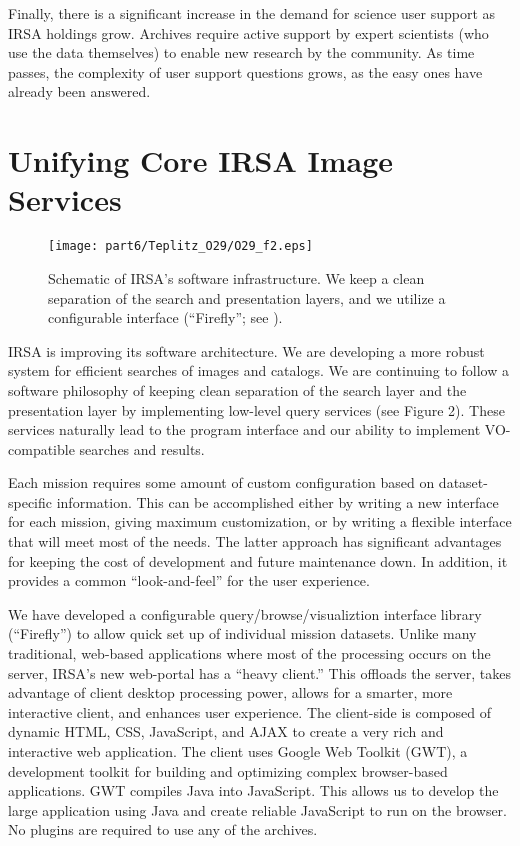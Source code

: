 Finally, there is a significant increase in the demand for
science user support as IRSA holdings grow.  Archives require active
support by expert scientists (who use the data themselves) to enable
new research by the community.  As time passes, the complexity of user
support questions grows, as the easy ones have already been answered.


\section{Unifying Core IRSA Image Services}

\begin{figure}[t]

\centering
\texttt{[image: part6/Teplitz\_O29/O29\_f2.eps]}
\caption{Schematic of IRSA's software infrastructure. We keep a clean 
separation of the search and presentation layers, and we utilize a
configurable interface (``Firefly''; see \citet{roby_XXII}).}

\end{figure}

IRSA is improving its software architecture. We are developing a more
robust system for efficient searches of images and catalogs. We are
continuing to follow a software philosophy of keeping clean separation
of the search layer and the presentation layer by implementing
low-level query services (see Figure 2). These services naturally lead to the program
interface and our ability to implement VO-compatible
searches and results.

Each mission requires some amount of custom configuration
based on dataset-specific information.  This can be accomplished
either by writing a new interface for each mission, giving maximum
customization, or by writing a flexible interface that will meet most
of the needs.  The latter approach has significant advantages for
keeping the cost of development and future maintenance down.  In
addition, it provides a common ``look-and-feel'' for the user experience.

We have developed a configurable query/browse/visualiztion interface
library (``Firefly'') to allow quick set up of individual mission
datasets.  Unlike many traditional, web-based applications where most
of the processing occurs on the server, IRSA’s new web-portal has a
“heavy client.” This offloads the server, takes advantage of client
desktop processing power, allows for a smarter, more interactive
client, and enhances user experience. The client-side is composed of
dynamic HTML, CSS, JavaScript, and AJAX to create a very rich and
interactive web application. The client uses Google Web Toolkit (GWT),
a development toolkit for building and optimizing complex
browser-based applications. GWT compiles Java into JavaScript. This
allows us to develop the large application using Java and create
reliable JavaScript to run on the browser. No plugins are required to
use any of the archives.  


